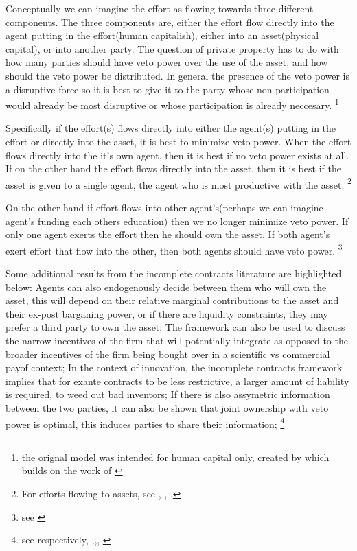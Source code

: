 \documentclass[12pt]{article}
\numberwithin{equation}{section}
\begin{document}
Conceptually we can imagine the effort as flowing towards three different components. The three components are, either the effort flow directly into the agent putting in the effort(human capitalish), either into an asset(physical capital), or into another party. The question of private property has to do with how many parties should have veto power over the use of the asset, and how should the veto power be distributed. In general the presence of the veto power is a disruptive force so it is best to give it to the party whose non-participation would already be most disruptive or whose participation is already neccesary. \footnote{the orignal model was intended for human capital only, created by \cite{Hart1990} which builds on the work of \cite{Grossman1986} }

Specifically if the effort(s) flows directly into either the agent(s) putting in the effort or directly into the asset, it is best to minimize veto power. When the effort flows directly into the it's own agent, then it is best if no veto power exists at all. If on the other hand the effort flows directly into the asset, then it is best if the asset is given to a single agent, the agent who is most productive with the asset. \footnote{For efforts flowing to assets, see \cite{schmitz2013investments}, \citet{gattai2016investment}, \cite{schmitz2017incomplete}. }

On the other hand if effort flows into other agent's(perhaps we can imagine agent's funding each others education) then we no longer minimize veto power. If only one agent exerts the effort then he should own the asset. If both agent's exert effort that flow into the other, then both agents should have veto power. \footnote{see \cite{hamada2011incentive}}

Some additional results from the incomplete contracts literature are highlighted below: Agents can also endogenously decide between them who will own the asset, this will depend on their relative marginal contributions to the asset and their ex-post barganing power, or if there are liquidity constraints, they may prefer a third party to own the asset; The framework can also be used to discuss the narrow incentives of the firm that will potentially integrate as opposed to the broader incentives of the firm being bought over in a scientific vs commercial payof context; In the context of innovation, the incomplete contracts framework implies that for exante contracts to be less restrictive, a larger amount of liability is required, to weed out bad inventors; If there is also assymetric information between the two parties, it can also be shown that joint ownership with veto power is optimal, this induces parties to share their information; \footnote{see respectively, \cite{Aghion1994},\citep{Lerner2005},\citep{Anton1994}, \citep{Rosenkranz1999}}
\end{document}

